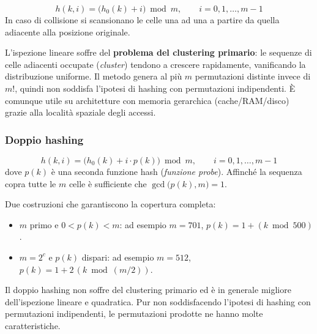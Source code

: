 \begin{definizione}
	\[
	h(k, i) = \bigl(h_0(k) + i\bigr) \bmod m, \qquad i = 0, 1, \ldots, m-1
	\]
	In caso di collisione si scansionano le celle una ad una a partire da
	quella adiacente alla posizione originale.
\end{definizione}

\begin{hardnote}
	L'ispezione lineare soffre del \textbf{problema del clustering primario}:
	le sequenze di celle adiacenti occupate (\emph{cluster}) tendono a crescere
	rapidamente, vanificando la distribuzione uniforme. Il metodo genera al più
	$m$ permutazioni distinte invece di $m!$, quindi non soddisfa l'ipotesi di
	hashing con permutazioni indipendenti. È comunque utile su architetture con
	memoria gerarchica (cache/RAM/disco) grazie alla località spaziale degli
	accessi.
\end{hardnote}

\subsubsection{Doppio hashing}

\begin{definizione}
	\[
	h(k, i) = \bigl(h_0(k) + i \cdot p(k)\bigr) \bmod m,
	\qquad i = 0, 1, \ldots, m-1
	\]
	dove $p(k)$ è una seconda funzione hash (\emph{funzione probe}). Affinché
	la sequenza copra tutte le $m$ celle è sufficiente che
	$\gcd\bigl(p(k), m\bigr) = 1$.
\end{definizione}

\begin{nota}
	Due costruzioni che garantiscono la copertura completa:
	\begin{itemize}
		\item $m$ primo e $0 < p(k) < m$: ad esempio $m = 701$,
		$p(k) = 1 + (k \bmod 500)$.
		\item $m = 2^c$ e $p(k)$ dispari: ad esempio $m = 512$,
		$p(k) = 1 + 2\,(k \bmod (m/2))$.
	\end{itemize}
	Il doppio hashing non soffre del clustering primario ed è in generale
	migliore dell'ispezione lineare e quadratica. Pur non soddisfacendo
	l'ipotesi di hashing con permutazioni indipendenti, le permutazioni
	prodotte ne hanno molte caratteristiche.
\end{nota}


